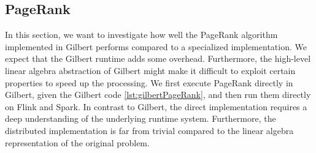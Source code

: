 




\subsection{PageRank}

In this section, we want to investigate how well the PageRank algorithm~\cite{page:1999a} implemented in Gilbert performs compared to a specialized implementation.
We expect that the Gilbert runtime adds some overhead.
Furthermore, the high-level linear algebra abstraction of Gilbert might make it difficult to exploit certain properties to speed up the processing.
We first execute PageRank directly in Gilbert, given the Gilbert code \cref{lst:gilbertPageRank}, and then run them directly on Flink and Spark.
In contrast to Gilbert, the direct implementation requires a deep understanding of the underlying runtime system.
Furthermore, the distributed implementation is far from trivial compared to the linear algebra representation of the original problem.

